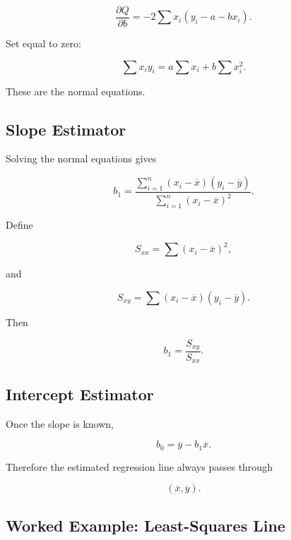 \[
\frac{\partial Q}{\partial b}
=
-2
\sum
x_i(y_i-a-bx_i).
\]

Set equal to zero:

\[
\sum x_iy_i
=
a\sum x_i
+
b\sum x_i^2.
\]

These are the normal equations.

\subsection{Slope Estimator}
\label{subsec:slope-estimator}

Solving the normal equations gives

\[
\boxed{
b_1
=
\frac{
\sum_{i=1}^{n}
(x_i-\overline{x})
(y_i-\overline{y})
}{
\sum_{i=1}^{n}
(x_i-\overline{x})^2
}.
}
\]

Define

\[
S_{xx}
=
\sum
(x_i-\overline{x})^2,
\]

and

\[
S_{xy}
=
\sum
(x_i-\overline{x})
(y_i-\overline{y}).
\]

Then

\[
\boxed{
b_1
=
\frac{S_{xy}}{S_{xx}}.
}
\]

\subsection{Intercept Estimator}
\label{subsec:intercept-estimator}

Once the slope is known,

\[
\boxed{
b_0
=
\overline{y}
-
b_1\overline{x}.
}
\]

Therefore the estimated regression line always passes through

\[
\boxed{
(\overline{x},\overline{y}).
}
\]

\subsection{Worked Example: Least-Squares Line}
\label{subsec:worked-least-squares-line}

